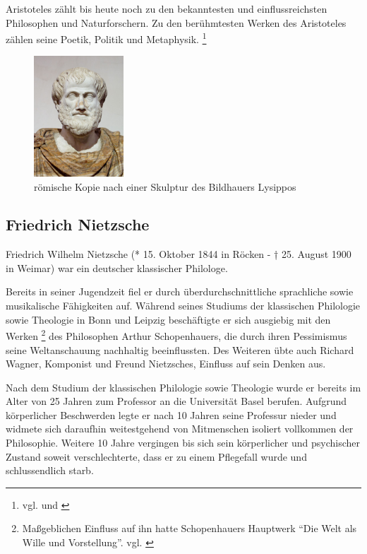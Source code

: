 Aristoteles zählt bis heute noch zu den bekanntesten und einflussreichsten Philosophen und Naturforschern. Zu den berühmtesten Werken des Aristoteles zählen seine Poetik, Politik und Metaphysik.
\footnote{vgl. \cite{Aristoteles1} und \cite{Aristoteles2}}
\begin{figure}[H]
\centering 
 \includegraphics[width=0.3\textwidth]{Bilder/kap3/Aristoteles} 
 \caption{römische Kopie nach einer Skulptur des Bildhauers Lysippos \cite{WikiAR}  \label{portraitAristotles}}
\end{figure}

\subsection{Friedrich Nietzsche}
Friedrich Wilhelm Nietzsche (* 15. Oktober 1844 in Röcken - † 25. August 1900 in Weimar) war ein deutscher klassischer Philologe.

Bereits in seiner Jugendzeit fiel er durch überdurchschnittliche sprachliche sowie musikalische Fähigkeiten auf.
Während seines Studiums der klassischen Philologie sowie Theologie in Bonn und Leipzig beschäftigte er sich ausgiebig mit den Werken
\footnote{Maßgeblichen Einfluss auf ihn hatte Schopenhauers Hauptwerk \enquote{Die Welt als Wille und Vorstellung}. vgl. \cite{Schopenhauer1}}
des Philosophen Arthur Schopenhauers, die durch ihren Pessimismus seine Weltanschauung nachhaltig beeinflussten.
Des Weiteren übte auch Richard Wagner, Komponist und Freund Nietzsches, Einfluss auf sein Denken aus.

Nach dem Studium der klassischen Philologie sowie Theologie wurde er bereits im Alter von 25 Jahren zum Professor an die Universität Basel berufen.
Aufgrund körperlicher Beschwerden legte er nach 10 Jahren seine Professur nieder und widmete sich daraufhin weitestgehend von Mitmenschen isoliert vollkommen der Philosophie.
Weitere 10 Jahre vergingen bis sich sein körperlicher und psychischer Zustand soweit verschlechterte, dass er zu einem Pflegefall wurde und schlussendlich starb.

